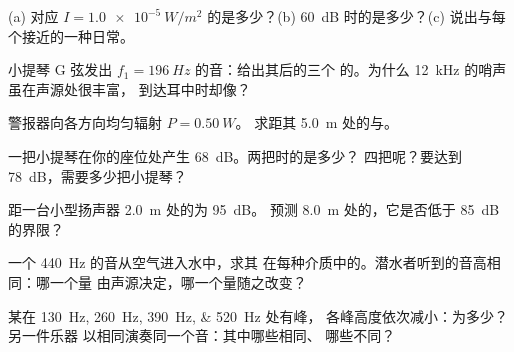 \begin{exercise}[$\star$]\label{exo:g12:sound-acoustics:4}
(a) 对应 $I = \qty{1.0e-5}{W/m^2}$ 的是多少？(b)
\qty{60}{dB} 时的是多少？(c) 说出与每个接近的一种日常。
\end{exercise}

\begin{exercise}[$\star$]\label{exo:g12:sound-acoustics:5}
小提琴 G 弦发出 $f_1 = \qty{196}{Hz}$ 的音：给出其后的三个
的。为什么 \qty{12}{kHz} 的哨声虽在声源处很丰富，
到达耳中时却像？
\end{exercise}

\begin{exercise}[$\star\star$]\label{exo:g12:sound-acoustics:6}
警报器向各方向均匀辐射 $P = \qty{0.50}{W}$。
求距其 \qty{5.0}{m} 处的与。
\end{exercise}

\begin{exercise}[$\star\star$]\label{exo:g12:sound-acoustics:7}
一把小提琴在你的座位处产生 \qty{68}{dB}。两把时的是多少？
四把呢？要达到 \qty{78}{dB}，需要多少把小提琴？
\end{exercise}

\begin{exercise}[$\star\star$]\label{exo:g12:sound-acoustics:8}
距一台小型扬声器 \qty{2.0}{m} 处的为 \qty{95}{dB}。
预测 \qty{8.0}{m} 处的，它是否低于 \qty{85}{dB} 的界限？
\end{exercise}

\begin{exercise}[$\star\star$]\label{exo:g12:sound-acoustics:9}
一个 \qty{440}{Hz} 的音从空气进入水中，求其
在每种介质中的。潜水者听到的音高相同：哪一个量
由声源决定，哪一个量随之改变？
\end{exercise}

\begin{exercise}[$\star\star$]\label{exo:g12:sound-acoustics:10}
某在 \qtylist{130;260;390;520}{Hz} 处有峰，
各峰高度依次减小：为多少？另一件乐器
以相同演奏同一个音：其中哪些相同、
哪些不同？
\end{exercise}

